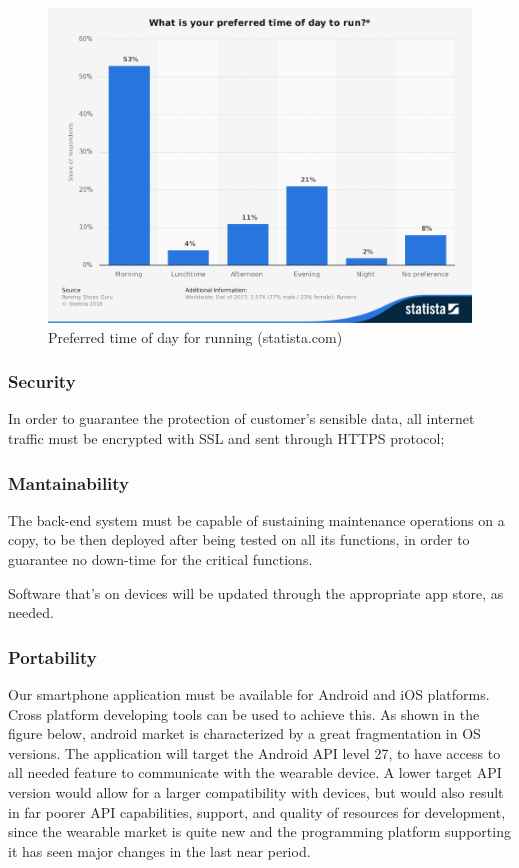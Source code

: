 \documentclass[../main.tex]{subfiles}
\begin{document}
\begin{figure}[H]
	\center
	\includegraphics[scale=0.35]{images/statista_runhours.png}
	\caption{Preferred time of day for running (statista.com)}
\end{figure}

\subsubsection{Security}

In order to guarantee the protection of customer's sensible data, all internet traffic must be encrypted with SSL and sent through HTTPS protocol;


\subsubsection{Mantainability}

The back-end system must be capable of sustaining maintenance operations on a copy, to be then deployed after being tested on all its functions, in order to guarantee no down-time for the critical functions.

Software that's on devices will be updated through the appropriate app store, as needed.

\subsubsection{Portability}

Our smartphone application must be available for Android and iOS platforms. Cross platform developing tools can be used to achieve this.
As shown in the figure below, android market is characterized by a great fragmentation in OS versions. The application will target the Android API level 27, to have access to all needed feature to communicate with the wearable device. A lower target API version would allow for a larger compatibility with devices, but would also result in far poorer API capabilities, support, and quality of resources for development, since the wearable market is quite new and the programming platform supporting it has seen major changes in the last near period.
\end{document}
